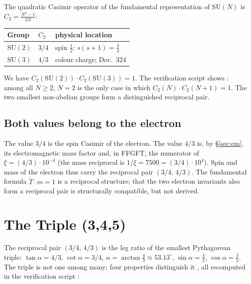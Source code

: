 The quadratic Casimir operator of the fundamental representation of
$\mathrm{SU}(N)$ is $C_2 = \tfrac{N^2-1}{2N}$:
\begin{center}
\begin{tabular}{@{}lll@{}}
\toprule
Group & $C_2$ & physical location \\
\midrule
$\mathrm{SU}(2)$ & $3/4$ & spin $\tfrac12$: $s(s+1) = \tfrac34$ \\
$\mathrm{SU}(3)$ & $4/3$ & colour charge; Doc.~324 \\
\bottomrule
\end{tabular}
\end{center}
We have $C_2(\mathrm{SU}(2))\cdot C_2(\mathrm{SU}(3)) = 1$. The verification
script shows \BM: among all $N\ge2$, $N=2$ is the only case in which
$C_2(N)\cdot C_2(N{+}1)=1$. The two smallest non-abelian groups form a
distinguished reciprocal pair.

\subsection{Both values belong to the electron \SM}

The value $3/4$ is the spin Casimir of the electron. The value $4/3$ is, by
§\ref{sec:em}, its electromagnetic mass factor and, in FFGFT, the numerator of
$\xi = (4/3)\cdot10^{-4}$ (the mass reciprocal is $1/\xi=7500=(3/4)\cdot10^4$). Spin and mass of the electron thus carry the
reciprocal pair $(3/4,\,4/3)$. The fundamental formula $\tilde T\cdot m = 1$ is
a reciprocal structure; that the two electron invariants also form a reciprocal
pair is structurally compatible, but not derived.

\section{The Triple (3,4,5)}
\label{sec:345}

The reciprocal pair $(3/4,\,4/3)$ is the leg ratio of the smallest Pythagorean
triple: $\tan\alpha = 4/3$, $\cot\alpha = 3/4$, $\alpha = \arctan\tfrac43
\approx 53.13^\circ$, $\sin\alpha = \tfrac45$, $\cos\alpha = \tfrac35$. The
triple is not one among many; four properties distinguish it \EM, all
recomputed in the verification script \BM:

